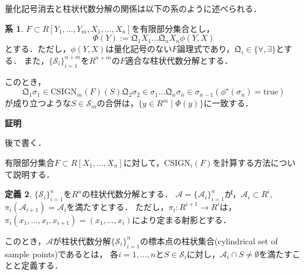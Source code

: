 \documentclass[uplatex, dvipdfmx]{jsarticle}
\makeatletter
\numberwithin{equation}{section}
\renewenvironment{proof}[1][\proofname]{\par
  \pushQED{\qed}%
  \normalfont \topsep6\p@\@plus6\p@\relax
  \trivlist
  \item\relax
  {\bfseries
  #1\@addpunct{.}}\hspace\labelsep\ignorespaces
}{
  \popQED\endtrivlist\@endpefalse
}
\newcommand{\Qua}{\mathfrak{Q}}
\newcommand{\calS}{\mathcal{S}}
\newcommand{\CSIGN}{\mathrm{CSIGN}}
\newcommand{\map}[3]{{#1}\colon{#2}\rightarrow{#3}}
\newcommand{\true}{\text{true}}
\theoremstyle{definition}
\newtheorem{definition}{定義}[section]
\newtheorem{corollary}[definition]{系}
\renewcommand{\proofname}{\textbf{証明}}
\makeatother
\begin{document}
量化記号消去と柱状代数分解の関係は以下の系のように述べられる．
\begin{corollary}
     $F \subset R[Y_1, \dots, Y_m, X_1, \dots, X_n]$を有限部分集合とし，
     \begin{equation}
          \Phi(Y):= \Qua_1 X_1 \dots \Qua_n X_n \phi(Y,X)
     \end{equation}
     とする．ただし，$\phi(Y,X)$は量化記号のない$F$論理式であり，$\Qua_i \in \{\forall, \exists\}$とする．
     また，$\{\calS_i\}_{i=1}^{n+m}$を$R^{n+m}$の$F$適合な柱状代数分解とする．

     このとき，
     \begin{equation}
          \Qua_1 \sigma_1 \in \CSIGN_m(F)(S) \Qua_2 \sigma_2 \in \sigma_1 \dots \Qua_n \sigma_n \in \sigma_{n-1}(\phi^\star(\sigma_n) = \true)
     \end{equation}
     が成り立つような$S \in \calS_m$の合併は，$\{y \in R^m \mid \Phi(y)\}$に一致する．
\end{corollary}

\begin{proof}
     後で書く．
\end{proof}


有限部分集合$F \subset R[X_1, \dots, X_n]$に対して，$\CSIGN_i(F)$を計算する方法について説明する．

\begin{definition}
     $\{\calS_i\}_{i=1}^n$を$R^n$の柱状代数分解とする．
     $\mathcal{A}=\{\mathcal{A}_{i}\}_{i=1}^n$が，$\mathcal{A}_i \subset R^i$, $\pi_i(\mathcal{A}_{i+1}) = \mathcal{A}_i$を満たすとする．
     ただし，$\map{\pi_i}{R^{i+1}}{R^i}$は，$\pi_i(x_1, \dots, x_i, x_{i+1}) = (x_1, \dots, x_i)$により定まる射影とする．
     
     このとき，$\mathcal{A}$が柱状代数分解$\{\calS_i\}_{i=1}^n$の標本点の柱状集合(cylindrical set of sample points)であるとは，
     各$i=1, \dots, n$と$S\in \calS_i$に対し，$\mathcal{A}_i\cap S \neq \emptyset$を満たすことと定義する．
\end{definition}
\end{document}
